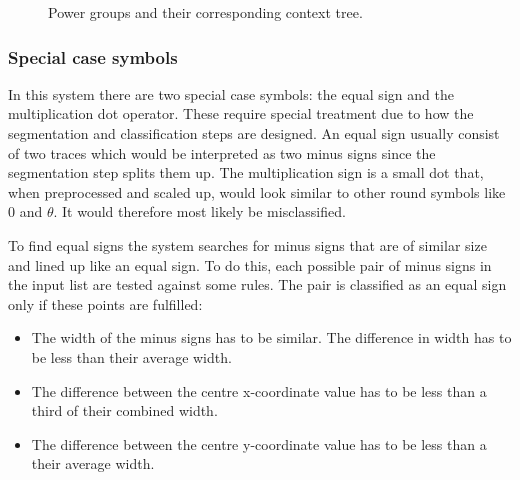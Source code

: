 \begin{figure}[H]
    \caption{Power groups and their corresponding context tree.}
\end{figure}


\subsubsection{Special case symbols}
\label{interpretation-special-symbols}

In this system there are two special case symbols: the equal sign and the multiplication dot operator. These require special treatment due to how the segmentation and classification steps are designed. An equal sign usually consist of two traces which would be interpreted as two minus signs since the segmentation step splits them up. The multiplication sign is a small dot that, when preprocessed and scaled up, would look similar to other round symbols like 0 and $\theta$. It would therefore most likely be misclassified.

To find equal signs the system searches for minus signs that are of similar size and lined up like an equal sign. To do this, each possible pair of minus signs in the input list are tested against some rules. The pair is classified as an equal sign only if these points are fulfilled:

\begin{itemize}
    \setlength\itemsep{0em}
    \item The width of the minus signs has to be similar. The difference in width has to be less than their average width.
    \item The difference between the centre x-coordinate value has to be less than a third of their combined width.
    \item The difference between the centre y-coordinate value has to be less than a their average width.
\end{itemize}

